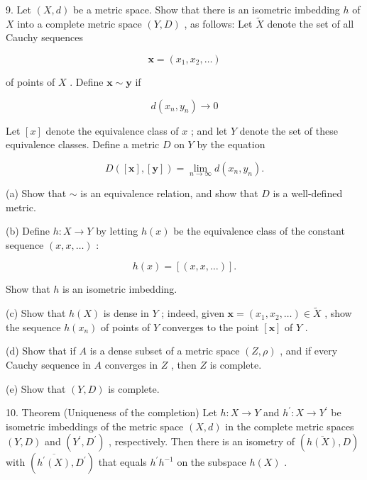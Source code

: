\documentclass[10pt]{article}
\begin{document}
9. Let \(\left( {X,d}\right)\) be a metric space. Show that there is an isometric imbedding \(h\) of \(X\) into a complete metric space \(\left( {Y,D}\right)\) , as follows: Let \(\widetilde{X}\) denote the set of all Cauchy sequences

\[
\mathbf{x} = \left( {{x}_{1},{x}_{2},\ldots }\right)
\]

of points of \(X\) . Define \(\mathbf{x} \sim  \mathbf{y}\) if

\[
d\left( {{x}_{n},{y}_{n}}\right)  \rightarrow  0
\]

Let \(\left\lbrack  x\right\rbrack\) denote the equivalence class of \(x\) ; and let \(Y\) denote the set of these equivalence classes. Define a metric \(D\) on \(Y\) by the equation

\[
D\left( {\left\lbrack  \mathbf{x}\right\rbrack  ,\left\lbrack  \mathbf{y}\right\rbrack  }\right)  = \mathop{\lim }\limits_{{n \rightarrow  \infty }}d\left( {{x}_{n},{y}_{n}}\right) .
\]

(a) Show that \(\sim\) is an equivalence relation, and show that \(D\) is a well-defined metric.

(b) Define \(h : X \rightarrow  Y\) by letting \(h\left( x\right)\) be the equivalence class of the constant sequence \(\left( {x,x,\ldots }\right)\) :

\[
h\left( x\right)  = \left\lbrack  \left( {x,x,\ldots }\right) \right\rbrack  .
\]

Show that \(h\) is an isometric imbedding.

(c) Show that \(h\left( X\right)\) is dense in \(Y\) ; indeed, given \(\mathbf{x} = \left( {{x}_{1},{x}_{2},\ldots }\right)  \in  \widetilde{X}\) , show the sequence \(h\left( {x}_{n}\right)\) of points of \(Y\) converges to the point \(\left\lbrack  \mathbf{x}\right\rbrack\) of \(Y\) .

(d) Show that if \(A\) is a dense subset of a metric space \(\left( {Z,\rho }\right)\) , and if every Cauchy sequence in \(A\) converges in \(Z\) , then \(Z\) is complete.

(e) Show that \(\left( {Y,D}\right)\) is complete.

10. Theorem (Uniqueness of the completion) Let \(h : X \rightarrow  Y\) and \({h}^{\prime } : X \rightarrow  {Y}^{\prime }\) be isometric imbeddings of the metric space \(\left( {X,d}\right)\) in the complete metric spaces \(\left( {Y,D}\right)\) and \(\left( {{Y}^{\prime },{D}^{\prime }}\right)\) , respectively. Then there is an isometry of \(\left( {\overline{h\left( X\right) },D}\right)\) with \(\left( {\overline{{h}^{\prime }\left( X\right) },{D}^{\prime }}\right)\) that equals \({h}^{\prime }{h}^{-1}\) on the subspace \(h\left( X\right)\) .
\end{document}
